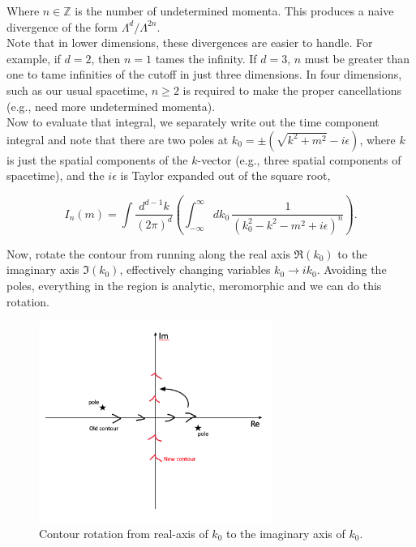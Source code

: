 \documentclass[10pt]{article}
\begin{document}
\noindent Where $n \in \mathbb{Z}$ is the number of undetermined momenta. This produces a naive divergence of the form $\Lambda^d / \Lambda^{2n}$. \\

\noindent Note that in lower dimensions, these divergences are easier to handle. For example, if $d=2$, then $n=1$ tames the infinity. If $d=3$, $n$ must be greater than one to tame infinities of the cutoff in just three dimensions. In four dimensions, such as our usual spacetime, $n \ge 2$ is required to make the proper cancellations (e.g., need more undetermined momenta). \\

\noindent Now to evaluate that integral, we separately write out the time component integral and note that there are two poles at $k_0 = \pm( \sqrt{k^2 + m^2} -i \epsilon)$, where $k$ is just the spatial components of the $k$-vector (e.g., three spatial components of spacetime), and the $i\epsilon$ is Taylor expanded out of the square root,

\begin{equation}
I_n (m) = \int \frac{d^{d-1} k}{(2 \pi)^d} \left( \int_{-\infty}^\infty dk_0 \, \frac{1}{(k_0^2 - k^2 - m^2 + i \epsilon)^n} \right).
\end{equation}

\noindent Now, rotate the contour from running along the real axis $\Re (k_0)$ to the imaginary axis $\Im (k_0)$, effectively changing variables $k_0 \rightarrow i k_0$. Avoiding the poles, everything in the region is analytic, meromorphic and we can do this rotation.  \\

\begin{figure}[H]
	\centering
	\includegraphics[width=3in]{images/contour.png}
	\caption*{Contour rotation from real-axis of $k_0$ to the imaginary axis of $k_0$.}
\end{figure}
\end{document}
